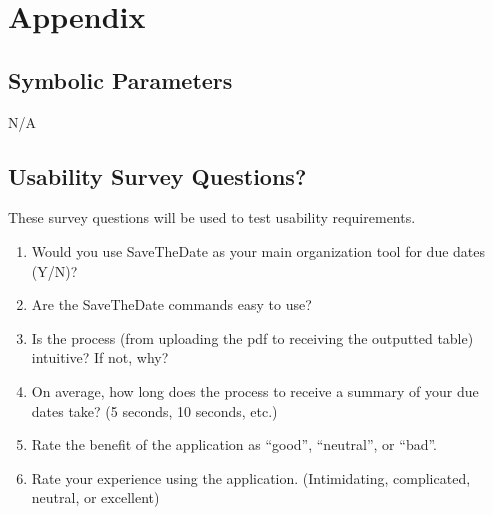 \documentclass[12pt, titlepage]{article}
\begin{document}




\newpage

\section{Appendix}

\subsection{Symbolic Parameters}

N/A

\subsection{Usability Survey Questions?}

These survey questions will be used to test usability requirements.

\begin{enumerate}

\item Would you use SaveTheDate as your main organization tool for due dates (Y/N)? 

\item Are the SaveTheDate commands easy to use? 

\item Is the process (from uploading the pdf to receiving the outputted table) intuitive? If not, why? 

\item On average, how long does the process to receive a summary of your due dates take? (5 seconds, 10 seconds, etc.) 

\item Rate the benefit of the application as “good”, “neutral”, or “bad”.  

\item Rate your experience using the application. (Intimidating, complicated, neutral, or excellent) 

\end{enumerate}
\end{document}
